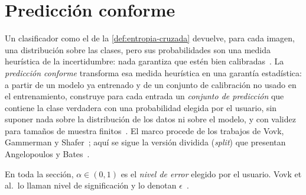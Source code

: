 
\section{Predicción conforme}\label{sec:prediccion-conforme}
%

Un clasificador como el de la \cref{def:entropia-cruzada} devuelve, para cada
imagen, una distribución sobre las clases, pero sus probabilidades son una medida
heurística de la incertidumbre: nada garantiza que estén bien
calibradas~\cite{angelopoulos2021}. La \emph{predicción conforme} transforma esa
medida heurística en una garantía estadística: a partir de un modelo ya entrenado
y de un conjunto de calibración no usado en el entrenamiento, construye para cada
entrada un \emph{conjunto de predicción} que contiene la clase verdadera con una
probabilidad elegida por el usuario, sin suponer nada sobre la distribución de los
datos ni sobre el modelo, y con validez para tamaños de muestra
finitos~\cite{angelopoulos2021}. El marco procede de los trabajos de Vovk,
Gammerman y Shafer~\cite{vovk2022,shafer2008}; aquí se sigue la versión dividida
(\emph{split}) que presentan Angelopoulos y Bates~\cite{angelopoulos2021}.

En toda la sección, $\alpha \in (0,1)$ es el \emph{nivel de error} elegido por el
usuario. Vovk et al.\ lo llaman nivel de significación y lo denotan
$\epsilon$~\cite{vovk2022}.

